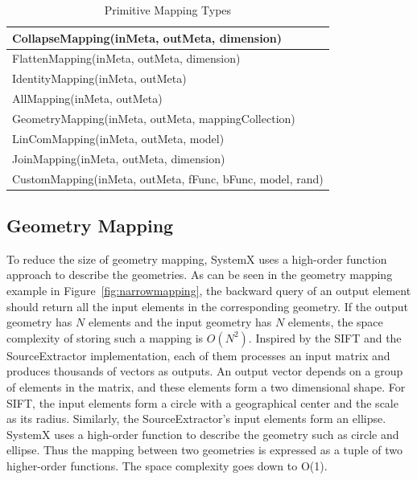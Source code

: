 \documentclass{sig-alternate}
\begin{document}
\begin{table}[t]
\begin{center}
    \caption{Primitive Mapping Types}
    \begin{scriptsize}
    \begin{tabular}{ | p{8cm}|}
    \hline
    CollapseMapping(inMeta, outMeta, dimension) \\ \hline 
    FlattenMapping(inMeta, outMeta, dimension) \\ \hline
    IdentityMapping(inMeta, outMeta) \\ \hline
    AllMapping(inMeta, outMeta) \\ \hline
    GeometryMapping(inMeta, outMeta, mappingCollection) \\ \hline
    LinComMapping(inMeta, outMeta, model) \\ \hline
    JoinMapping(inMeta, outMeta, dimension) \\ \hline
    CustomMapping(inMeta, outMeta, fFunc, bFunc, model, rand) \\ \hline
    \end{tabular}
    \end{scriptsize}
    \label{tb:mapping-interface}
\end{center}   
\end{table}

\subsection{Geometry Mapping}
\label{sec:Design-GeometryMapping}
To reduce the size of geometry mapping, SystemX uses a high-order function approach to describe the geometries.
As can be seen in the geometry mapping example in Figure~\ref{fig:narrowmapping}, the backward query of an 
output element should return all the input elements in the corresponding geometry. If the output geometry has 
$N$ elements and the input geometry has $N$ elements, the space complexity of storing such a mapping is $O(N^2)$. 
Inspired by the SIFT and the SourceExtractor implementation, each of them processes an input matrix and produces 
thousands of vectors as outputs. An output vector depends on a group of elements in the matrix, and these elements 
form a two dimensional shape. 
For SIFT, the input elements form a circle with a geographical center and the scale as its radius.
Similarly, the SourceExtractor's input elements form an ellipse. 
SystemX uses a high-order function to describe the geometry such as circle and ellipse. 
Thus the mapping between two geometries is expressed as a tuple of two higher-order functions.
The space complexity goes down to O(1).
\end{document}
